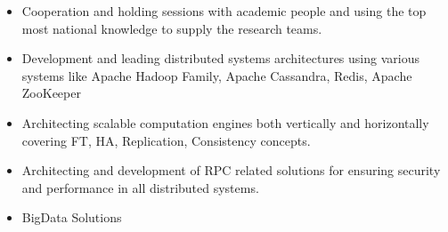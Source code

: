 \documentclass[10pt,a4paper]{article}
\begin{document}
\begin{itemize}
    \item \small Cooperation and holding sessions with academic people and using the top most national knowledge to supply the research teams.
    \item \small Development and leading distributed systems architectures using various systems like Apache Hadoop Family, Apache Cassandra, Redis, Apache ZooKeeper
    \item \small Architecting scalable computation engines both vertically and horizontally covering FT, HA, Replication, Consistency  concepts.
    \item \small Architecting and development of RPC related solutions for ensuring security and performance in all distributed systems.
     \item \small BigData Solutions
  \end{itemize}
  \setlength{\leftskip}{0pt}
  \setlength{\rightskip}{0cm}
	  
\end{document}
